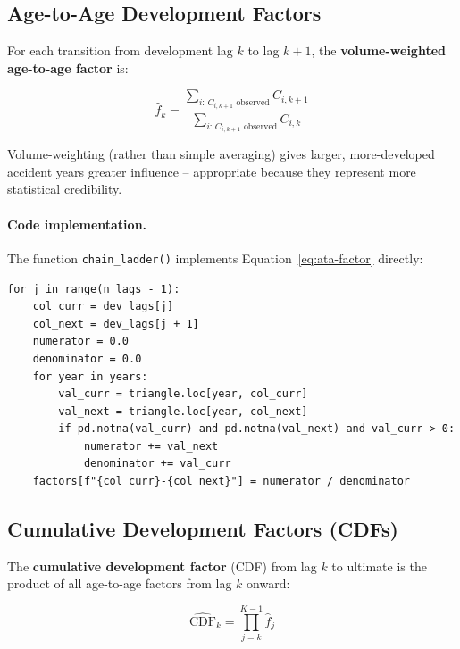 \subsection{Age-to-Age Development Factors}

For each transition from development lag $k$ to lag $k+1$, the
\textbf{volume-weighted age-to-age factor} is:

\begin{equation}
  \hat{f}_k = \frac{\displaystyle\sum_{i:\, C_{i,k+1} \text{ observed}}
                      C_{i,k+1}}
                   {\displaystyle\sum_{i:\, C_{i,k+1} \text{ observed}}
                      C_{i,k}}
  \label{eq:ata-factor}
\end{equation}

Volume-weighting (rather than simple averaging) gives larger, more-developed
accident years greater influence -- appropriate because they represent more
statistical credibility.

\paragraph{Code implementation.}
The function \texttt{chain\_ladder()} implements Equation~\eqref{eq:ata-factor}
directly:

\begin{lstlisting}[style=python, caption={Age-to-age factor computation (\texttt{04\_compute\_reserves.py}, lines 70--88)}]
for j in range(n_lags - 1):
    col_curr = dev_lags[j]
    col_next = dev_lags[j + 1]
    numerator = 0.0
    denominator = 0.0
    for year in years:
        val_curr = triangle.loc[year, col_curr]
        val_next = triangle.loc[year, col_next]
        if pd.notna(val_curr) and pd.notna(val_next) and val_curr > 0:
            numerator += val_next
            denominator += val_curr
    factors[f"{col_curr}-{col_next}"] = numerator / denominator
\end{lstlisting}

\subsection{Cumulative Development Factors (CDFs)}

The \textbf{cumulative development factor} (CDF) from lag $k$ to ultimate
is the product of all age-to-age factors from lag $k$ onward:

\begin{equation}
  \widehat{\mathrm{CDF}}_k = \prod_{j=k}^{K-1} \hat{f}_j
  \label{eq:cdf}
\end{equation}

